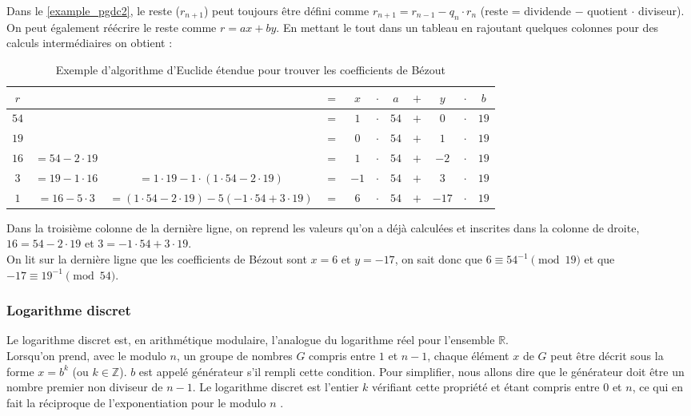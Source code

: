 \documentclass[10pt,a4paper,twoside]{article}
\numberwithin{equation}{section}
\begin{document}
				 Dans le \autoref{example_pgdc2}, le reste ($r_{n+1}$) peut toujours être défini comme $r_{n+1} = r_{n-1} - q_n \cdot r_n$ (reste = dividende $-$ quotient $\cdot$ diviseur). On peut également réécrire le reste comme $r = ax + by$. En mettant le tout dans un tableau en rajoutant quelques colonnes pour des calculs intermédiaires on obtient :
				 \begin{table}[H]
				 	\centering
				 	\begin{tabular}{|c|c|c|cccccccc|}
				 		\hline
				 		\rowcolor{gray!40} $r$ & & & $=$ & $x$ & $\cdot$ & $a$ & $+$ & $y$ & $\cdot$ & $b$ \\
				 		\hline
				 		$54$ & & & $=$ & $1$ & $\cdot$ & $54$ & $+$ & $0$ & $\cdot$ & $19$ \\
				 		\hline
				 		$19$ & & & $=$ & $0$ & $\cdot$ & $54$ & $+$ & $1$ & $\cdot$ & $19$\\
						\hline				 	
						$16$ & $ = 54 - 2\cdot 19$ & & $=$ & $1$ & $\cdot$ & $54$ & $+$ & $-2$ & $\cdot$ & $19$ \\
						\hline
						$3$ & $ = 19 - 1\cdot 16$ & $ = 1\cdot 19 - 1 \cdot (1 \cdot 54 - 2 \cdot 19)$ & $=$ & $-1$ & $\cdot$ & $54$ & $+$ & $3$ & $\cdot$ & $19$ \\
						\hline
						$1$ & $ = 16 - 5\cdot 3$ & $ = (1\cdot 54 - 2\cdot 19) - 5(-1\cdot 54 + 3\cdot 19)$ & $=$ & \cellcolor{yellow!40}$6$ & $\cdot$ & $54$ & $+$ & \cellcolor{yellow!40}$-17$ & $\cdot$ & $19$\\
						\hline
				 	\end{tabular}
				 	\caption{Exemple d'algorithme d'Euclide étendue pour trouver les coefficients de Bézout}
				 \end{table}
				Dans la troisième colonne de la dernière ligne, on reprend les valeurs qu'on a déjà calculées et inscrites dans la colonne de droite, $16 = 54 - 2\cdot 19$ et $3 = -1\cdot 54 + 3\cdot 19$.\\
				
				On lit sur la dernière ligne que les coefficients de Bézout sont $x = 6$ et $y = -17$, on sait donc que $6 \equiv 54^{-1} \pmod{19}$ et que $-17 \equiv 19^{-1} \pmod{54}$. 
				
		
		\subsubsection{Logarithme discret} \label{discrete_log}
			Le logarithme discret est, en arithmétique modulaire, l'analogue du logarithme réel pour l'ensemble $\mathbb{R}$. \\
			Lorsqu'on prend, avec le modulo $n$, un groupe de nombres $G$ compris entre $1$ et $n-1$, chaque élément $x$ de $G$ peut être décrit sous la forme $x = b^k$ (ou $k \in \mathbb{Z}$). $b$ est appelé générateur s'il rempli cette condition. Pour simplifier, nous allons dire que le générateur doit être un nombre premier non diviseur de $n-1$. Le logarithme discret est l'entier $k$ vérifiant cette propriété et étant compris entre $0$ et $n$, ce qui en fait la réciproque de l'exponentiation pour le modulo $n$ \cite{wiki:logarithme_discret}.
\end{document}
